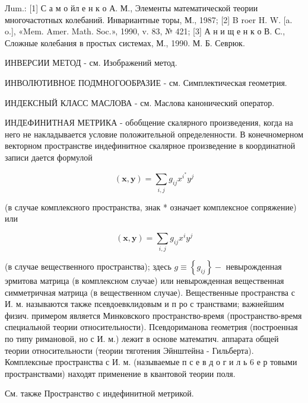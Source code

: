\documentclass[10pt]{article}
\begin{document}
Лum.: [1] С а м о йл е н к о А. М., Элементы математической теории многочастотных колебаний. Инвариантные торы, М., 1987; [2] B roer H. W. [a. o.], «Mem. Amer. Math. Soc.», 1990, v. 83, № 421; [3] А н и щ е н к о В. С., Сложные колебания в простых системах, М., 1990. М. Б. Севрюк.



ИНВЕРСИИ МЕТОД - см. Изображений метод.



ИНВОЛЮТИВНОЕ ПОДМНОГООБРАЗИЕ - см. Симплектическая геометрия.



ИНДЕКСНЫЙ КЛАСС МАСЛОВА - см. Маслова канонический оператор.



ИНДЕФИНИТНАЯ МЕТРИКА - обобщение скалярного произведения, когда на него не накладывается условие положительной определенности. В конечномерном векторном пространстве индефинитное скалярное произведение в координатной записи дается формулой



\[

(\boldsymbol{x}, \boldsymbol{y})=\sum_{i, j} g_{i j} x^{i^{*}} y^{j}

\]



(в случае комплексного пространства, знак * означает комплексное сопряжение) или



\[

(\boldsymbol{x}, \boldsymbol{y})=\sum_{i, j} g_{i j} x^{i} y^{j}

\]



(в случае вещественного пространства); здесь $g \equiv\left\{g_{i j}\right\}-$ невырожденная эрмитова матрица (в комплексном случае) или невырожденная вещественная симметричная матрица (в вещественном случае). Вещественные пространства с И. м. называются также псевдоевклидовым и п ро с транствами; важнейшим физич. примером является Минковского пространство-время (пространство-время специальной теории относительности). Псевдориманова геометрия (построенная по типу римановой, но с И. м.) лежит в основе математич. аппарата общей теории относительности (теории тяготения Эйнштейна - Гильберта). Комплексные пространства с И. м. (называемые п с е в д о г и л ь 6 е р товыми пространствами) находят применение в квантовой теории поля.



См. также Пространство с индефинитной метрикой.
\end{document}
